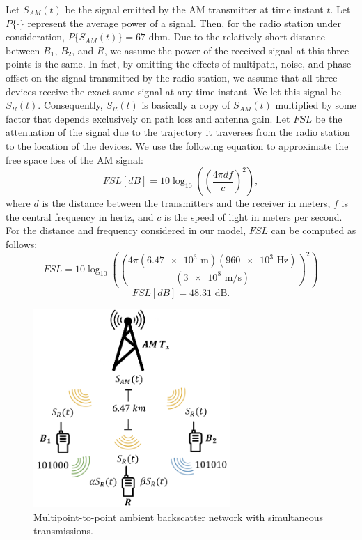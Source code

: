 \documentclass[letterpaper, 10 pt, conference]{IEEEconf}
\begin{document}
Let $S_{AM}(t)$ be the signal emitted by the AM transmitter at time instant $t$. Let $P\{\cdot\}$ represent the average power of a signal. Then, for the radio station under consideration, $P\{S_{AM}(t)\}=67$ dbm. Due to the relatively short distance between $B_1$, $B_2$, and $R$, we assume the power of the received signal at this three points is the same. In fact, by omitting the effects of multipath, noise, and phase offset on the signal transmitted by the radio station, we assume that all three devices receive the exact same signal at any time instant. We let this signal be $S_R(t)$. Consequently, $S_R(t)$ is basically a copy of $S_{AM}(t)$ multiplied by some factor that depends exclusively on path loss and antenna gain. Let $FSL$ be the attenuation of the signal due to the trajectory it traverses from the radio station to the location of the devices. We use the following equation to approximate the free space loss of the AM signal:
$$FSL[dB]=10\log_{10}((\frac{4\pi df}{c})^2),$$
where $d$ is the distance between the transmitters and the receiver in meters, $f$ is the central frequency in hertz, and $c$ is the speed of light in meters per second. For the distance and frequency considered in our model, $FSL$ can be computed as follows:
$$FSL=10\log_{10}((\frac{4\pi (\num{6.47e3} \text{ m})(\num{960e3} \text{ Hz})}{(\num{3e8} \text{ m/s})})^2)$$
$$FSL[dB]=48.31 \text{ dB.}$$

\begin{figure}[h!]
  \centerline{\includegraphics[width=75mm,scale=0.50]{Figure_1.png}}
  \caption{Multipoint-to-point ambient backscatter network with simultaneous transmissions.}
\end{figure}
\end{document}
